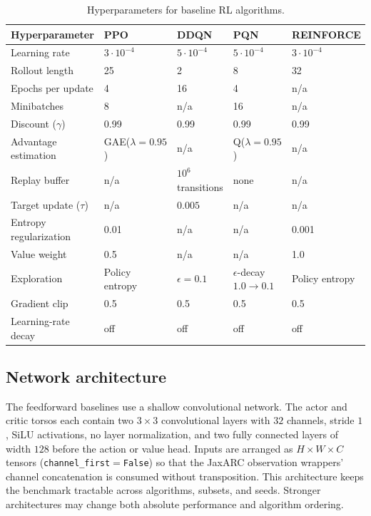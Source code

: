 \begin{table}[htbp]
\centering
\caption{Hyperparameters for baseline RL algorithms.}
\label{tab:algorithm_hyperparams}
\scriptsize
\begin{tabular}{@{}lllll@{}}
\toprule
\textbf{Hyperparameter} & \textbf{PPO} & \textbf{DDQN} & \textbf{PQN} & \textbf{REINFORCE} \\
\midrule
Learning rate & $3\!\cdot\!10^{-4}$ & $5\!\cdot\!10^{-4}$ & $5\!\cdot\!10^{-4}$ & $3\!\cdot\!10^{-4}$ \\
Rollout length & 25 & 2 & 8 & 32 \\
Epochs per update & 4 & 16 & 4 & n/a \\
Minibatches & 8 & n/a & 16 & n/a \\
Discount ($\gamma$) & 0.99 & 0.99 & 0.99 & 0.99 \\
Advantage estimation & GAE($\lambda{=}0.95$) & n/a & Q($\lambda{=}0.95$) & n/a \\
Replay buffer & n/a & $10^6$ transitions & none & n/a \\
Target update ($\tau$) & n/a & $0.005$ & n/a & n/a \\
Entropy regularization & 0.01 & n/a & n/a & 0.001 \\
Value weight & 0.5 & n/a & n/a & 1.0 \\
Exploration & Policy entropy & $\epsilon{=}0.1$ & $\epsilon$-decay $1.0\!\to\!0.1$ & Policy entropy \\
Gradient clip & 0.5 & 0.5 & 0.5 & 0.5 \\
Learning-rate decay & off & off & off & off \\
\bottomrule
\end{tabular}
\end{table}

\subsection{Network architecture}
\label{app:network_architecture}

The feedforward baselines use a shallow convolutional network. The actor and critic torsos each contain two $3\times3$ convolutional layers with $32$ channels, stride $1$, SiLU activations, no layer normalization, and two fully connected layers of width $128$ before the action or value head. Inputs are arranged as $H{\times}W{\times}C$ tensors (\texttt{channel\_first}$=$\texttt{False}) so that the JaxARC observation wrappers' channel concatenation is consumed without transposition. This architecture keeps the benchmark tractable across algorithms, subsets, and seeds. Stronger architectures may change both absolute performance and algorithm ordering.

